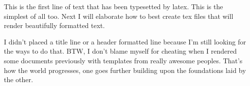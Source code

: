 \documentclass[a4paper,12pt]{article}
\begin{document}
This is the first line of text that has been typesetted by latex. This is the simplest of all too. Next I will elaborate how to best create tex files that will render beautifully formatted text.

I didn't placed a title line or a header formatted line because I'm still looking for the ways to do that. BTW, I don't blame myself for cheating when I rendered some documents previously with templates from really awesome peoples. That's how the world progresses, one goes further building upon the foundations laid by the other.
\end{document}
